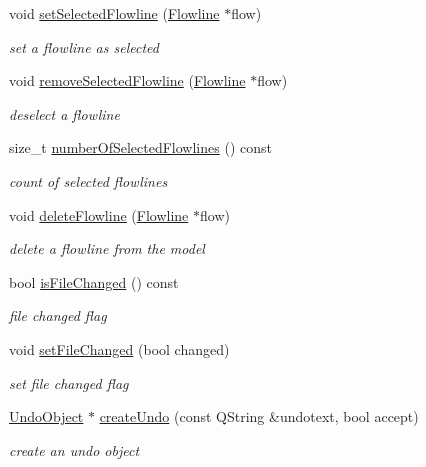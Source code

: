 \begin{DoxyCompactItemize}
void \hyperlink{classShipCAD_1_1ShipCADModel_a33962f53b44136c2840f8f7fa2e362f3}{set\+Selected\+Flowline} (\hyperlink{classShipCAD_1_1Flowline}{Flowline} $\ast$flow)
\begin{DoxyCompactList}\small\item\em set a flowline as selected \end{DoxyCompactList}\item 
void \hyperlink{classShipCAD_1_1ShipCADModel_a341f8be57a7cf6c04356a731b3b30c37}{remove\+Selected\+Flowline} (\hyperlink{classShipCAD_1_1Flowline}{Flowline} $\ast$flow)
\begin{DoxyCompactList}\small\item\em deselect a flowline \end{DoxyCompactList}\item 
size\+\_\+t \hyperlink{classShipCAD_1_1ShipCADModel_a4c534c40efab65e1b92481f1fa7f07a9}{number\+Of\+Selected\+Flowlines} () const 
\begin{DoxyCompactList}\small\item\em count of selected flowlines \end{DoxyCompactList}\item 
void \hyperlink{classShipCAD_1_1ShipCADModel_a7777da02744250aebce9be35063ba0f5}{delete\+Flowline} (\hyperlink{classShipCAD_1_1Flowline}{Flowline} $\ast$flow)
\begin{DoxyCompactList}\small\item\em delete a flowline from the model \end{DoxyCompactList}\item 
bool \hyperlink{classShipCAD_1_1ShipCADModel_aac25049d627953c15c5343b2f888f688}{is\+File\+Changed} () const 
\begin{DoxyCompactList}\small\item\em file changed flag \end{DoxyCompactList}\item 
void \hyperlink{classShipCAD_1_1ShipCADModel_ae8fe6d69df313f7459235de1a0614e8c}{set\+File\+Changed} (bool changed)
\begin{DoxyCompactList}\small\item\em set file changed flag \end{DoxyCompactList}\item 
\hyperlink{classShipCAD_1_1UndoObject}{Undo\+Object} $\ast$ \hyperlink{classShipCAD_1_1ShipCADModel_a0e9a74dd26baa734437aba2ee05fa940}{create\+Undo} (const Q\+String \&undotext, bool accept)
\begin{DoxyCompactList}\small\item\em create an undo object \end{DoxyCompactList}\item 

\end{DoxyCompactItemize}
